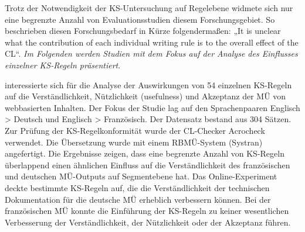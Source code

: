 
Trotz der Notwendigkeit der KS-Untersuchung auf Regelebene widmete sich nur eine begrenzte Anzahl von Evaluationsstudien diesem Forschungsgebiet. So beschrieben \citet[257]{NybergEtAl2003} diesen Forschungsbedarf in Kürze folgendermaßen: „It is unclear what the contribution of each individual writing rule is to the overall effect of the CL“. \textit{Im Folgenden werden Studien mit dem Fokus auf der Analyse des Einflusses einzelner KS-Regeln präsentiert}.

\citet{Roturier2006} interessierte sich für die Analyse der Auswirkungen von 54 einzelnen KS-Regeln auf die Verständlichkeit, Nützlichkeit (usefulness) und Akzeptanz der MÜ von webbasierten Inhalten. Der Fokus der Studie lag auf den Sprachenpaaren Englisch > Deutsch und Englisch > Französisch. Der Datensatz bestand aus 304 Sätzen. Zur Prüfung der KS-Regelkonformität wurde der CL-Checker Acrocheck verwendet. Die Übersetzung wurde mit einem RBMÜ-Sys\-tem (Systran) angefertigt. Die Ergebnisse zeigen, dass eine begrenzte Anzahl von KS-Regeln überlappend einen ähnlichen Einfluss auf die Verständlichkeit des französischen und deutschen MÜ-Outputs auf Segmentebene hat. Das Online-Experiment deckte bestimmte KS-Regeln auf, die die Verständlichkeit der technischen Dokumentation für die deutsche MÜ erheblich verbessern können. Bei der französischen MÜ konnte die Einführung der KS-Regeln zu keiner wesentlichen Verbesserung der Verständlichkeit, der Nützlichkeit oder der Akzeptanz führen.

